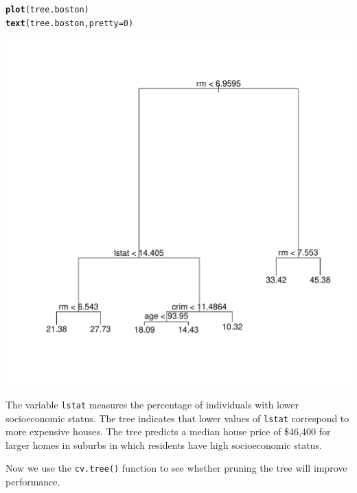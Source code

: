\documentclass[12pt]{article}\usepackage[]{graphicx}\usepackage[]{color}
\makeatletter
\def\maxwidth{ %
  \ifdim\Gin@nat@width>\linewidth
    \linewidth
  \else
    \Gin@nat@width
  \fi
}
\newcommand{\hlnum}[1]{\textcolor[rgb]{0.686,0.059,0.569}{#1}}%
\newcommand{\hlstd}[1]{\textcolor[rgb]{0.345,0.345,0.345}{#1}}%
\newcommand{\hlkwc}[1]{\textcolor[rgb]{0.333,0.667,0.333}{#1}}%
\newcommand{\hlkwd}[1]{\textcolor[rgb]{0.737,0.353,0.396}{\textbf{#1}}}%
\newenvironment{kframe}{%
 \def\at@end@of@kframe{}%
 \ifinner\ifhmode%
  \def\at@end@of@kframe{\end{minipage}}%
  \begin{minipage}{\columnwidth}%
 \fi\fi%
 \def\FrameCommand##1{\hskip\@totalleftmargin \hskip-\fboxsep
 \colorbox{shadecolor}{##1}\hskip-\fboxsep
     \hskip-\linewidth \hskip-\@totalleftmargin \hskip\columnwidth}%
 \MakeFramed {\advance\hsize-\width
   \@totalleftmargin\z@ \linewidth\hsize
   \@setminipage}}%
 {\par\unskip\endMakeFramed%
 \at@end@of@kframe}
\newenvironment{knitrout}{}{} %
\makeatother
\begin{document}
\begin{knitrout}
\color{fgcolor}\begin{kframe}
\begin{alltt}
\hlkwd{plot}\hlstd{(tree.boston)}
\hlkwd{text}\hlstd{(tree.boston,} \hlkwc{pretty}\hlstd{=}\hlnum{0}\hlstd{)}
\end{alltt}
\end{kframe}
\includegraphics[width=\maxwidth]{figure/unnamed-chunk-15-1} 

\end{knitrout}

The variable \texttt{lstat} measures the percentage of individuals with lower socioeconomic status. The tree indicates that lower values of \texttt{lstat} correspond to more expensive houses. The tree predicts a median house price of \$46,400 for larger homes in suburbs in which residents have high socioeconomic status.

Now we use the \texttt{cv.tree()} function to see whether pruning the tree will improve performance.
\end{document}
